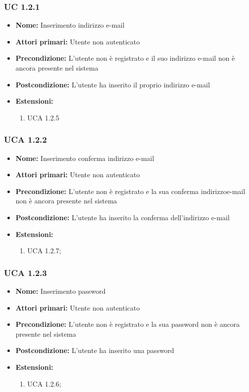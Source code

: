 \documentclass[a4paper, oneside, dvipsnames, table]{article} %
\begin{document}
\subsubsection{UC 1.2.1}%
\begin{itemize}
\item \textbf{Nome:} Inserimento indirizzo e-mail
\item \textbf{Attori primari:} Utente non autenticato
\item \textbf{Precondizione:} L’utente non è registrato e il suo indirizzo e-mail non è ancora presente nel sistema
\item \textbf{Postcondizione:}  L’utente ha inserito il proprio indirizzo e-mail
\item \textbf{Estensioni:}
	\begin{enumerate}
		\item UCA 1.2.5
	\end{enumerate}
\end{itemize}

\subsubsection{UCA 1.2.2}%
\begin{itemize}
\item \textbf{Nome:} Inserimento conferma indirizzo e-mail
\item \textbf{Attori primari:} Utente non autenticato
\item \textbf{Precondizione:} L’utente non è registrato e la sua conferma indirizzoe-mail non è ancora presente nel sistema
\item \textbf{Postcondizione:}  L’utente ha inserito la conferma dell'indirizzo e-mail
\item \textbf{Estensioni:}
	\begin{enumerate}
		\item UCA 1.2.7;
	\end{enumerate} 
\end{itemize}


\subsubsection{UCA 1.2.3}%
\begin{itemize}
\item \textbf{Nome:} Inserimento password
\item \textbf{Attori primari:} Utente non autenticato
\item \textbf{Precondizione:} L’utente non è registrato e la sua password non è ancora presente nel sistema
\item \textbf{Postcondizione:} L’utente ha inserito una password
\item \textbf{Estensioni:}
	\begin{enumerate}
		\item UCA 1.2.6;
	\end{enumerate}
\end{itemize}
\end{document}
